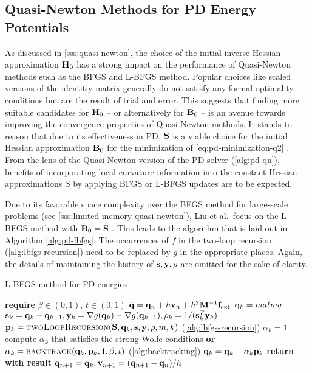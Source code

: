 \subsection{Quasi-Newton Methods for PD Energy Potentials}\label{ss:qn-pd}
As discussed in \cref{sss:quasi-newton}, 
the choice of the initial inverse Hessian approximation $\mathbf{H}_0$ has a strong impact on the performance of Quasi-Newton
methods such as the BFGS and L-BFGS method. Popular choices like scaled versions of the identitiy matrix generally do not
satisfy any formal optimality conditions but are the result of trial and error. This suggests that finding more suitable 
candidates for $\mathbf{H}_0$ -- or alternatively for $\mathbf{B}_0$ -- is an avenue towards improving the convergence properties of 
Quasi-Newton methods. It stands to reason that due to its effectiveness in PD, $\mathbf{S}$ is a viable choice for the 
initial Hessian approximation $\mathbf{B}_0$ for the minimization of \autoref{eq:pd-minimization-q2} \cite{liu2017}. From the lens
of the Quasi-Newton version of the PD solver (\cref{alg:pd-qn}), benefits of incorporating local curvature information into
the constant Hessian approximations $S$ by applying BFGS or L-BFGS updates are to be expected.

Due to its favorable space complexity over the BFGS method for large-scale problems (see \cref{sss:limited-memory-quasi-newton}), 
Liu et al.\ focus on the L-BFGS method with $\mathbf{B}_0 = \mathbf{S}$ \cite{liu2017}. This leads to the algorithm that is laid out in
Algorithm \ref{alg:pd-lbfgs}. The occurrences of $f$ in the two-loop recursion (\cref{alg:lbfgs-recursion}) need to be replaced by $g$ 
in the appropriate places. Again, the details of maintaining the history of $\mathbf{s}, \mathbf{y}, \rho$ are omitted for the sake of clarity.

\begin{algorithm}
\caption{L-BFGS method for PD energies}\label{alg:pd-lbfgs}
\begin{algorithmic}[1]
\State \textbf{require } $\beta \in (0, 1)$, $t \in (0, 1)$
\State $\tilde{\mathbf{q}} = \mathbf{q}_n + h\mathbf{v}_n + h^2\mathbf{M}^{-1}\mathbf{f}_{\text{ext}}$
\State $\mathbf{q}_k = \tilde{matm{q}}$
\State $\mathbf{s_k} = \mathbf{q}_k - \mathbf{q}_{k-1}, \mathbf{y}_k = \nabla g(\mathbf{q}_k) - \nabla g(\mathbf{q}_{k-1}), \rho_k = 1 / (\mathbf{s}^T_k \mathbf{y}_k)$
\State $\mathbf{p}_k = \text{\textsc{twoLoopRecursion}}(\mathbf{S}, \mathbf{q}_k, \mathbf{s}, \mathbf{y}, \rho, m, k)$   (\cref{alg:lbfgs-recursion})
\State $\alpha_k = 1$
\State compute $\alpha_k$ that satisfies the strong Wolfe conditions 
\State \textbf{or} $\alpha_k = \text{\textsc{backtrack}}(\mathbf{q}_k, \mathbf{p}_k, 1, \beta, t)$ (\cref{alg:backtracking})
\EndIf
\State $\mathbf{q}_k = \mathbf{q}_k + \alpha_k \mathbf{p}_k$
\EndFor
\State \textbf{return with result } $\mathbf{q}_{n+1} = \mathbf{q}_k, \mathbf{v}_{n+1} = (\mathbf{q}_{n+1} - \mathbf{q}_n)/h$
\EndProcedure
\end{algorithmic}
\end{algorithm}


